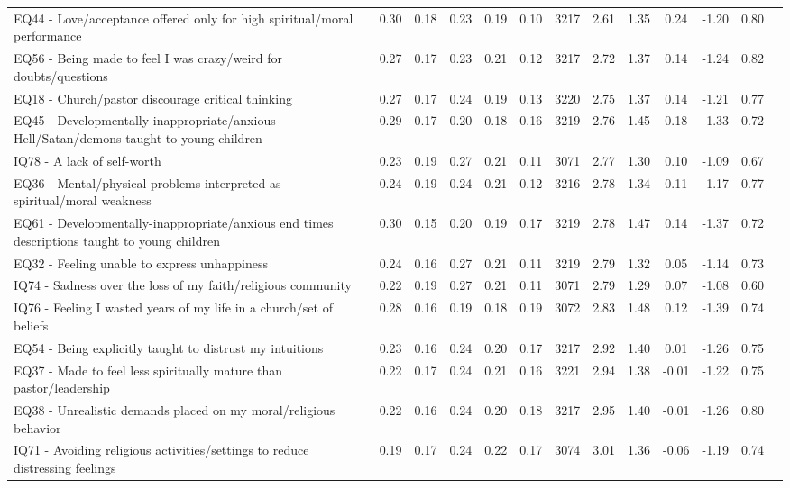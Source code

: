 \documentclass[
]{article}
\begin{document}
\begin{longtable}[t]{>{\raggedright\arraybackslash}p{2cm}cccccccccccc}
EQ44 - Love/acceptance offered only for high spiritual/moral performance & 0.30 & 0.18 & 0.23 & 0.19 & 0.10 & 3217 & 2.61 & 1.35 & 0.24 & -1.20 & 0.80 & \\
\addlinespace
EQ56 - Being made to feel I was crazy/weird for doubts/questions & 0.27 & 0.17 & 0.23 & 0.21 & 0.12 & 3217 & 2.72 & 1.37 & 0.14 & -1.24 & 0.82 & \\
EQ18 - Church/pastor discourage critical thinking & 0.27 & 0.17 & 0.24 & 0.19 & 0.13 & 3220 & 2.75 & 1.37 & 0.14 & -1.21 & 0.77 & \\
EQ45 - Developmentally-inappropriate/anxious Hell/Satan/demons taught to young children & 0.29 & 0.17 & 0.20 & 0.18 & 0.16 & 3219 & 2.76 & 1.45 & 0.18 & -1.33 & 0.72 & \\
IQ78 - A lack of self-worth & 0.23 & 0.19 & 0.27 & 0.21 & 0.11 & 3071 & 2.77 & 1.30 & 0.10 & -1.09 & 0.67 & \\
EQ36 - Mental/physical problems interpreted as spiritual/moral weakness & 0.24 & 0.19 & 0.24 & 0.21 & 0.12 & 3216 & 2.78 & 1.34 & 0.11 & -1.17 & 0.77 & \\
\addlinespace
EQ61 - Developmentally-inappropriate/anxious end times descriptions taught to young children & 0.30 & 0.15 & 0.20 & 0.19 & 0.17 & 3219 & 2.78 & 1.47 & 0.14 & -1.37 & 0.72 & \\
EQ32 - Feeling unable to express unhappiness & 0.24 & 0.16 & 0.27 & 0.21 & 0.11 & 3219 & 2.79 & 1.32 & 0.05 & -1.14 & 0.73 & \\
IQ74 - Sadness over the loss of my faith/religious community & 0.22 & 0.19 & 0.27 & 0.21 & 0.11 & 3071 & 2.79 & 1.29 & 0.07 & -1.08 & 0.60 & \\
IQ76 - Feeling I wasted years of my life in a church/set of beliefs & 0.28 & 0.16 & 0.19 & 0.18 & 0.19 & 3072 & 2.83 & 1.48 & 0.12 & -1.39 & 0.74 & \\
EQ54 - Being explicitly taught to distrust my intuitions & 0.23 & 0.16 & 0.24 & 0.20 & 0.17 & 3217 & 2.92 & 1.40 & 0.01 & -1.26 & 0.75 & \\
\addlinespace
EQ37 - Made to feel less spiritually mature than pastor/leadership & 0.22 & 0.17 & 0.24 & 0.21 & 0.16 & 3221 & 2.94 & 1.38 & -0.01 & -1.22 & 0.75 & \\
EQ38 - Unrealistic demands placed on my moral/religious behavior & 0.22 & 0.16 & 0.24 & 0.20 & 0.18 & 3217 & 2.95 & 1.40 & -0.01 & -1.26 & 0.80 & \\
IQ71 - Avoiding religious activities/settings to reduce distressing feelings & 0.19 & 0.17 & 0.24 & 0.22 & 0.17 & 3074 & 3.01 & 1.36 & -0.06 & -1.19 & 0.74 & \\

\end{longtable}
\end{document}
